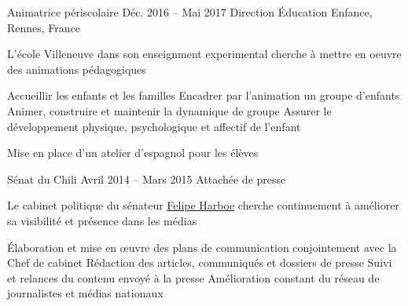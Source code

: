 %
%



\begin{joblist}



\item[Animatrice périscolaire]{Déc. 2016 -- Mai 2017 }     
  	{Direction Éducation Enfance, Rennes, France}     
	{
		 L'école Villeneuve dans son enseignment experimental cherche à mettre en oeuvre des animations pédagogiques   \\
		  
		\iftbftiny \setlength{\parskip}{-10pt} \fi
		\begin{itemize}
			  \iftbftiny \setlength\itemsep{-3pt} \fi
			  \cvitem[\checkmark] Accueillir les enfants et les familles
			  \cvitem[\checkmark] Encadrer par l’animation un groupe d’enfants
			  \cvitem[\checkmark] Animer, construire et maintenir la dynamique de groupe
			  \cvitem[\checkmark] Assurer le développement physique, psychologique et affectif de l’enfant
		\end{itemize}        

		 Mise en place d'un atelier d'espagnol pour les élèves
	}



\item[Sénat du Chili]{Avril 2014 -- Mars 2015}
     {Attachée de presse}
	 {
			 Le cabinet politique du sénateur \href{http://harboesenador.cl/}{Felipe Harboe} cherche continuement à améliorer sa visibilité et présence dans les médias \\ 
			\mission{Missions :} 
                
			\iftbftiny \setlength{\parskip}{-10pt} \fi
			\begin{itemize}
			  \iftbftiny \setlength\itemsep{-3pt} \fi
			  \cvitem[\checkmark] Élaboration et mise en œuvre des plans de communication conjointement avec la Chef de cabinet
			  \cvitem[\checkmark] Rédaction des articles, communiqués et dossiers de presse
			  \cvitem[\checkmark] Suivi et relances du contenu envoyé à la presse
			  \cvitem[\checkmark] Amélioration constant du réseau de journalistes et médias nationaux
			\end{itemize}     
			
}
\end{joblist}
